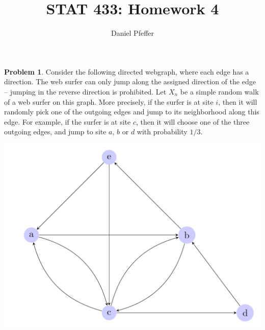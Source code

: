 \documentclass[oneside,reqno]{amsart}
\title{STAT 433: Homework 4}
\author{Daniel Pfeffer}
\theoremstyle{definition}
\newtheorem{prob}{Problem}
\begin{document}
\maketitle


\begin{prob}
Consider the following directed webgraph, where each edge has a direction. The web surfer can only jump along the assigned direction of the edge -- jumping in the reverse direction is prohibited. Let $X_n$ be a simple random walk of a web surfer on this graph. More precisely, if the surfer is at site $i$, then it will randomly pick one of the outgoing edges and jump to its neighborhood along this edge. For example, if the surfer is at site $c$, then it will choose one of the three outgoing edges, and jump to site $a$, $b$ or $d$ with probability $1/3$.
\begin{center}
\includegraphics[scale=0.4]{webgraph}
\end{center}
\end{prob}
\end{document}
